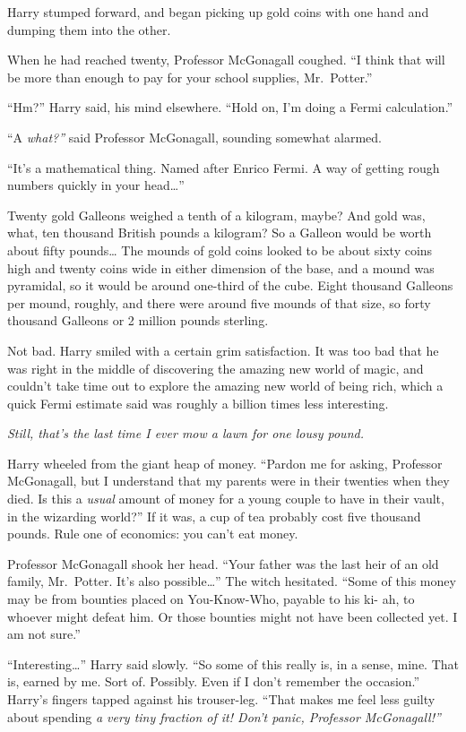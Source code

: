 Harry stumped forward, and began picking up gold coins with one hand and
dumping them into the other.

When he had reached twenty, Professor McGonagall coughed. ``I think that
will be more than enough to pay for your school supplies, Mr.~Potter.''

``Hm?'' Harry said, his mind elsewhere. ``Hold on, I'm doing a Fermi
calculation.''

``A \emph{what?''} said Professor McGonagall, sounding somewhat alarmed.

``It's a mathematical thing. Named after Enrico Fermi. A way of getting
rough numbers quickly in your head\ldots{}''

Twenty gold Galleons weighed a tenth of a kilogram, maybe? And gold was,
what, ten thousand British pounds a kilogram? So a Galleon would be
worth about fifty pounds\ldots{} The mounds of gold coins looked to be
about sixty coins high and twenty coins wide in either dimension of the
base, and a mound was pyramidal, so it would be around one-third of the
cube. Eight thousand Galleons per mound, roughly, and there were around
five mounds of that size, so forty thousand Galleons or 2 million pounds
sterling.

Not bad. Harry smiled with a certain grim satisfaction. It was too bad
that he was right in the middle of discovering the amazing new world of
magic, and couldn't take time out to explore the amazing new world of
being rich, which a quick Fermi estimate said was roughly a billion
times less interesting.

\emph{Still, that's the last time I ever mow a lawn for one lousy
pound.}

Harry wheeled from the giant heap of money. ``Pardon me for asking,
Professor McGonagall, but I understand that my parents were in their
twenties when they died. Is this a \emph{usual} amount of money for a
young couple to have in their vault, in the wizarding world?'' If it
was, a cup of tea probably cost five thousand pounds. Rule one of
economics: you can't eat money.

Professor McGonagall shook her head. ``Your father was the last heir of
an old family, Mr.~Potter. It's also possible\ldots{}'' The witch
hesitated. ``Some of this money may be from bounties placed on
You-Know-Who, payable to his ki- ah, to whoever might defeat him. Or
those bounties might not have been collected yet. I am not sure.''

``Interesting\ldots{}'' Harry said slowly. ``So some of this really is,
in a sense, mine. That is, earned by me. Sort of. Possibly. Even if I
don't remember the occasion.'' Harry's fingers tapped against his
trouser-leg. ``That makes me feel less guilty about spending \emph{a
very tiny fraction of it! Don't panic, Professor McGonagall!''}

